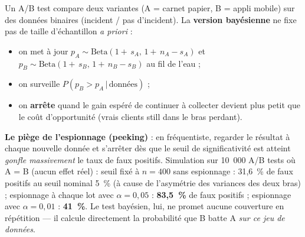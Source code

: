 \documentclass[11pt,a4paper]{article}
\newcommand{\given}{\,\vert\,}
\begin{document}
\begin{rappel}
Un A/B test compare deux variantes (A = carnet papier, B = appli mobile) sur
des données binaires (incident / pas d'incident). La \textbf{version
bayésienne} ne fixe pas de taille d'échantillon \emph{a priori} :
\begin{itemize}[leftmargin=4mm, itemsep=0.5mm]
  \item on met à jour $p_A \sim \text{Beta}(1+\,s_A,\, 1+\,n_A - s_A)$ et
        $p_B \sim \text{Beta}(1+\,s_B,\, 1+\,n_B - s_B)$ au fil de l'eau ;
  \item on surveille $P(p_B > p_A \given \text{données})$ ;
  \item on \textbf{arrête} quand le gain espéré de continuer à collecter
        devient plus petit que le coût d'opportunité (vrais clients
        still dans le bras perdant).
\end{itemize}
\textbf{Le piège de l'espionnage (peeking)} : en fréquentiste, regarder le
résultat à chaque nouvelle donnée et s'arrêter dès que le seuil de
significativité est atteint \emph{gonfle massivement} le taux de faux
positifs. Simulation sur 10~000 A/B tests où A = B (aucun effet réel) :
seuil fixé à $n = 400$ sans espionnage : 31,6~\% de faux positifs au
seuil nominal 5~\% (à cause de l'asymétrie des variances des deux bras) ;
espionnage à chaque lot avec $\alpha = 0{,}05$ : \textbf{83,5~\%} de faux
positifs ; espionnage avec $\alpha = 0{,}01$ : \textbf{41~\%}. Le test
bayésien, lui, ne promet aucune couverture en répétition --- il calcule
directement la probabilité que B batte A \emph{sur ce jeu de données}.
\end{rappel}
\end{document}
